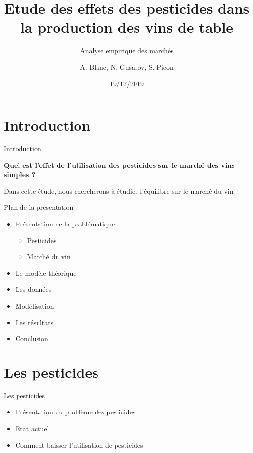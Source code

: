 \documentclass[11pt,ignorenonframetext,]{beamer}
\title{Etude des effets des pesticides dans la production des vins de table}
\subtitle{Analyse empirique des marchés}
\author{A. Blanc, N. Gusarov, S. Picon}
\institute{Université Grenoble Alpes}
\date{19/12/2019}
\providecommand{\tightlist}{%
  \setlength{\itemsep}{0pt}\setlength{\parskip}{0pt}}
\begin{document}
\frame{\titlepage}

\hypertarget{introduction}{%
\section{Introduction}\label{introduction}}

\begin{frame}{Introduction}
\protect\hypertarget{introduction-1}{}

\center

\textbf{Quel est l'effet de l'utilisation des pesticides sur le marché des vins simples ?}

Dans cette étude, nous chercherons à étudier l'équilibre sur le marché
du vin.

\end{frame}

\begin{frame}{Plan de la présentation}
\protect\hypertarget{plan-de-la-presentation}{}

\begin{itemize}
\tightlist
\item
  Présentation de la problématique

  \begin{itemize}
  \tightlist
  \item
    Pesticides
  \item
    Marché du vin
  \end{itemize}
\item
  Le modèle théorique
\item
  Les données
\item
  Modélisation
\item
  Les résultats
\item
  Conclusion
\end{itemize}

\end{frame}

\hypertarget{les-pesticides}{%
\section{Les pesticides}\label{les-pesticides}}

\begin{frame}{Les pesticides}
\protect\hypertarget{les-pesticides-1}{}

\begin{itemize}
\tightlist
\item
  Présentation du problème des pesticides
\item
  Etat actuel
\item
  Comment baisser l'utilisation de pesticides
\end{itemize}

\end{frame}
\end{document}
